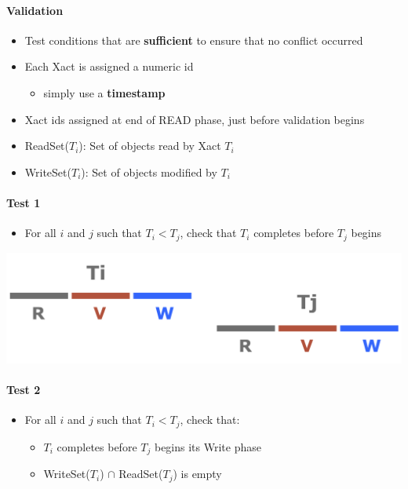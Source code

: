 \paragraph{Validation}
\begin{itemize}
\item Test conditions that are \textbf{sufficient} to ensure
  that no conflict occurred
\item Each Xact is assigned a numeric id
  \begin{itemize}
  \item simply use a \textbf{timestamp}
  \end{itemize}

\item Xact ids assigned at end of READ phase, just before
  validation begins

\item ReadSet($T_i$): Set of objects read by Xact $T_i$
\item WriteSet($T_i$): Set of objects modified by $T_i$
\end{itemize}

\paragraph{Test 1}
\begin{itemize}
\item For all $i$ and $j$ such that $T_i < T_j$, check that
  $T_i$ completes before $T_j$ begins
\end{itemize}

\includegraphics[scale=0.15]{graphics/Test-1.png}

\paragraph{Test 2}
\begin{itemize}
\item For all $i$ and $j$ such that $T_i < T_j$, check that:
  \begin{itemize}
  \item $T_i$ completes before $T_j$ begins its Write phase
  \item WriteSet($T_i$) $\cap$ ReadSet($T_j$) is empty
  \end{itemize}
\end{itemize}

